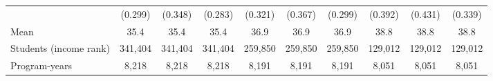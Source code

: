 \begin{tabular}{l*{9}{c}}
 & (0.299) & (0.348) & (0.283) & (0.321) & (0.367) & (0.299) & (0.392) & (0.431) & (0.339) \\
\quad \quad Mean &  35.4 &  35.4 &  35.4 &  36.9 &  36.9 &  36.9 &  38.8 &  38.8 &  38.8 \\
\midrule
Students (income rank) &   341,404 &   341,404 &   341,404 &   259,850 &   259,850 &   259,850 &   129,012 &   129,012 &   129,012 \\
Program-years &  8,218 &  8,218 &  8,218 &  8,191 &  8,191 &  8,191 &  8,051 &  8,051 &  8,051 \\
\bottomrule
\end{tabular}
